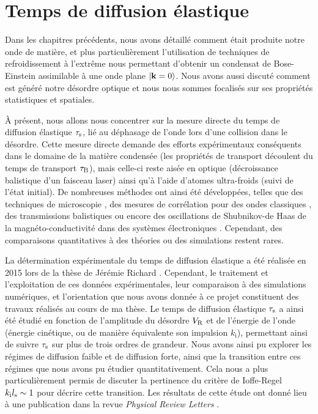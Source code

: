 \chapter{Temps de diffusion élastique}
\label{ch:TauS_PRL}

Dans les chapitres précédents, nous avons détaillé comment était produite notre onde de matière, et plus particulièrement l'utilisation de techniques de refroidissement à l'extrême nous permettant d'obtenir un condensat de Bose-Einstein assimilable à une onde plane $\left| \mathbf{k}=0 \right\rangle$. Nous avons aussi discuté comment est généré notre désordre optique et nous nous sommes focalisés sur ses propriétés statistiques et spatiales.

À présent, nous allons nous concentrer sur la mesure directe du temps de diffusion élastique $\tau_{\mathrm{s}}$, lié au déphasage de l'onde lors d'une collision dans le désordre. Cette mesure directe demande des efforts expérimentaux conséquents dans le domaine de la matière condensée (les propriétés de transport découlent du temps de transport $\tau_{\mathrm{B}}$), mais celle-ci reste aisée en optique (décroissance balistique d'un faisceau laser) ainsi qu'à l'aide d'atomes ultra-froids (suivi de l'état initial). De nombreuses méthodes ont ainsi été développées, telles que des techniques de microscopie \citep{jacques2012reflectance, martin2016determination}, des mesures de corrélation pour des ondes classiques \citep{hildebrand2014observation, obermann2014measuring, sebbah2002spatial}, des transmissions balistiques \citep{page1996group, savo2017observation} ou encore des oscillations de Shubnikov-de Haas de la magnéto-conductivité dans des systèmes électroniques \citep{bockelmann1990single, monteverde2010transport, niederer1974magneto}. Cependant, des comparaisons quantitatives à des théories ou des simulations restent rares.




La détermination expérimentale du temps de diffusion élastique a été réalisée en 2015 lors de la thèse de Jérémie Richard \citep{richard2015propagation}. Cependant, le traitement et l'exploitation de ces données expérimentales, leur comparaison à des simulations numériques, et l'orientation que nous avons donnée à ce projet constituent des travaux réalisés au cours de ma thèse. Le temps de diffusion élastique $\tau_{\mathrm{s}}$ a ainsi été étudié en fonction de l'amplitude du désordre $V_{\mathrm{R}}$ et de l'énergie de l'onde (énergie cinétique, ou de manière équivalente son impulsion $k_{\mathrm{i}}$), permettant ainsi de suivre $\tau_{\mathrm{s}}$ sur plus de trois ordres de grandeur. Nous avons ainsi pu explorer les régimes de diffusion faible et de diffusion forte, ainsi que la transition entre ces régimes que nous avons pu étudier quantitativement. Cela nous a plus particulièrement permis de discuter la pertinence du critère de Ioffe-Regel $k_{\mathrm{i}}l_{\mathrm{s}}\sim 1 $ pour décrire cette transition. Les résultats de cette étude ont donné lieu à une publication dans la revue \emph{Physical Review Letters} \citep{richard2019elastic}.




